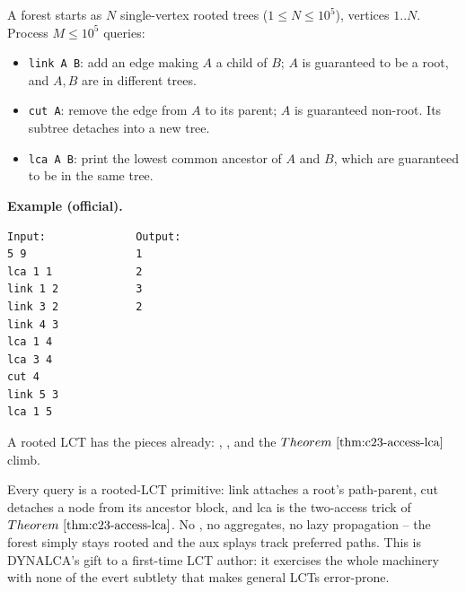 \begin{problemstatement}
A forest starts as \(N\) single-vertex rooted trees (\(1\le N\le 10^5\)), vertices
\(1..N\). Process \(M\le 10^5\) queries:
\begin{itemize}[nosep]
  \item \texttt{link A B}: add an edge making \(A\) a child of \(B\); \(A\) is
        guaranteed to be a root, and \(A,B\) are in different trees.
  \item \texttt{cut A}: remove the edge from \(A\) to its parent; \(A\) is
        guaranteed non-root. Its subtree detaches into a new tree.
  \item \texttt{lca A B}: print the lowest common ancestor of \(A\) and \(B\), which
        are guaranteed to be in the same tree.
\end{itemize}

\textbf{Example (official).}
\begin{verbatim}
Input:              Output:
5 9                 1
lca 1 1             2
link 1 2            3
link 3 2            2
link 4 3
lca 1 4
lca 3 4
cut 4
link 5 3
lca 1 5
\end{verbatim}
\end{problemstatement}

\begin{attemptgate}
A rooted LCT has the pieces already: , , and the
\(\thmref{c23-access-lca}\) climb. 
\end{attemptgate}

Every query is a rooted-LCT primitive: link attaches a root's path-parent, cut
detaches a node from its ancestor block, and lca is the two-access trick of
\(\thmref{c23-access-lca}\). No , no aggregates, no lazy propagation
-- the forest simply stays rooted and the aux splays track preferred paths. This is
DYNALCA's gift to a first-time LCT author: it exercises the whole 
machinery with none of the evert subtlety that makes general LCTs error-prone.

